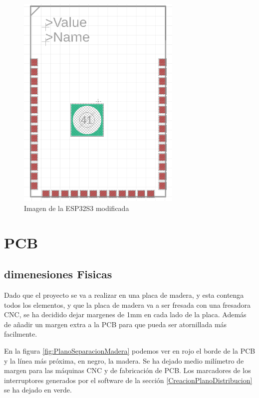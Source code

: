 \begin{figure}[H]
    \centering
    \includegraphics[width=0.7\textwidth]{imagenes/Capitulos/Cap13/ESP32S3HOLE.png}
    \caption{Imagen de la ESP32S3 modificada}
\end{figure}\label{fig:ESP32S3HOLE}

\section{PCB}\label{ApendicePCB}

\subsection{dimenesiones Fisicas}
Dado que el proyecto se va a realizar en una placa de madera, y esta contenga todos los elementos, y que la placa de madera va a ser fresada con una fresadora CNC, se ha decidido dejar margenes de 1mm en cada lado de la placa. Además de añadir un margen extra a la \gls{PCB} para que pueda ser atornillada más facilmente.

En la figura \ref{fig:PlanoSeparacionMadera} podemos ver en rojo el borde de la \gls{PCB} y la línea más próxima, en negro, la madera. Se ha dejado medio milímetro de margen para las máquinas \gls{CNC} y de fabricación de \gls{PCB}. Los marcadores de los interruptores generados por el software de la sección \ref{CreacionPlanoDistribucion} se ha dejado en verde.

